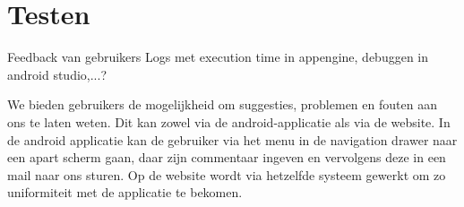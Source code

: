 \chapter{Testen}%
Feedback van gebruikers
Logs met execution time in appengine, debuggen in android studio,...?


We bieden gebruikers de mogelijkheid om suggesties, problemen en fouten aan ons te laten weten.
Dit kan zowel via de android-applicatie als via de website. In de android applicatie kan de gebruiker via het menu in de navigation drawer %
naar een apart scherm gaan, daar zijn commentaar ingeven en vervolgens deze in een mail naar ons sturen.
Op de website wordt via hetzelfde systeem gewerkt om zo uniformiteit met de applicatie te bekomen.